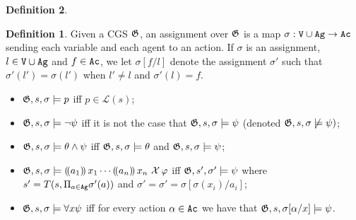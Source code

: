 \documentclass{article}
\theoremstyle{definition}
\newtheorem{definition}{Definition}[section]
\begin{document}
\begin{definition}
\begin{definition}
    Given a CGS $\mathfrak{G}$, an assignment over $\mathfrak{G}$ is a map 
     $\sigma : \texttt{V} \cup \texttt{Ag} \to \texttt{Ac}$ sending each variable and each agent to  an action. If $\sigma$ is an assignment, $l\in \texttt{V} \cup \texttt{Ag}$ and $f\in \texttt{Ac}$, we let $\sigma[f/l]$ denote the assignment $\sigma'$ such that $\sigma'(l')=\sigma(l')$ when $l'\neq l$ and $\sigma'(l)=f$. 
 
\end{definition}


\begin{itemize}
    \item $\mathfrak{G},s,\sigma \models p$ iff $p\in \mathcal{L}(s)$; 
    \item $\mathfrak{G},s,\sigma \models \neg \psi$ iff it is not the case that $\mathfrak{G},s,\sigma \models \psi$ (denoted $\mathfrak{G},s,\sigma \not\models \psi)$; 
    \item $\mathfrak{G},s,\sigma \models \theta \land\psi $ iff $\mathfrak{G},s,\sigma \models \theta$ and $\mathfrak{G},s,\sigma \models \psi$;
    \item $\mathfrak{G},s,\sigma \models (\!( a_1 )\!)\,{x_1}\cdots (\!( a_n )\!)\,{x_n} \ \mathcal{X}\, \varphi $ iff $\mathfrak{G},s' , \sigma' \models \psi $ where $s'=T(s, \Pi_{a\in \texttt{Ag}}\sigma'(a))$ and $\sigma'=\sigma'=\sigma[\sigma(x_i)/a_i]$; 
    
    \item $\mathfrak{G},s,\sigma \models \forall x \psi$ iff for every  action $\alpha\in \texttt{Ac}$ we have that $\mathfrak{G},s,\sigma[\alpha/x] \models \psi$.
    
\end{itemize}
    
\end{definition}
\end{document}
